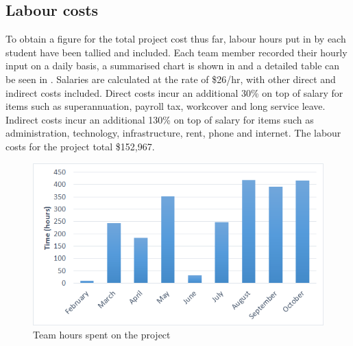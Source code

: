 \documentclass[main.tex]{subfiles}
\begin{document}
\subsection{Labour costs}
To obtain a figure for the total project cost thus far, labour hours put in by each student have been tallied and included.  Each team member recorded their hourly input on a daily basis, a summarised chart is shown in  and a detailed table can be seen in . Salaries are calculated at the rate of \$26/hr, with other direct and indirect costs included. Direct costs incur an additional 30\% on top of salary for items such as superannuation, payroll tax, workcover and long service leave. Indirect costs incur an additional 130\% on top of salary for items such as administration, technology, infrastructure, rent, phone and internet. The labour costs for the project total \$152,967.
\newpage
\begin{figure}[ht]
\centering
\includegraphics[]{6-ProjectManagement/teamhours.png}
\caption[]{Team hours spent on the project}
\end{figure}
\end{document}
